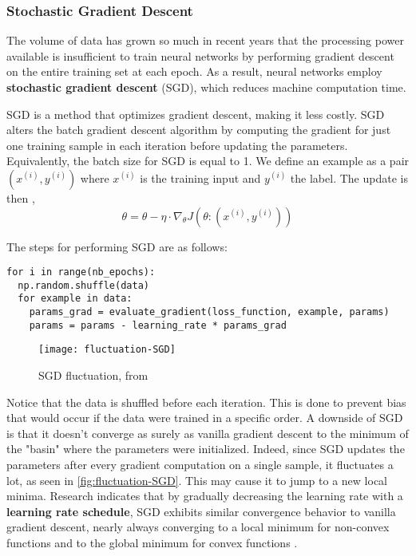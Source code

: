 \documentclass{article}
\begin{document}
\subsubsection{Stochastic Gradient Descent}%
  \label{subsub:Stochastic Gradient Descent}

The volume of data has grown so much in recent years that the processing power available is insufficient to train neural networks by performing gradient descent on the entire training set at each epoch. As a result, neural networks employ \textbf{stochastic gradient descent} (SGD), which reduces machine computation time. 

   SGD is a method that optimizes gradient descent, making it less costly. SGD alters the batch gradient descent algorithm by computing the gradient for just one training sample in each iteration before updating the parameters. Equivalently, the batch size for SGD is equal to 1. We define an example as a pair $(x^{(i)}, y^{(i)})$ where $x^{(i)}$ is the training input and $y^{(i)}$ the label. The update is then \citep{ruder2017overview},
   $$\theta = \theta - \eta \cdot \nabla_\theta J(\theta :(x^{(i)}, y^{(i)}) ) $$

   The steps for performing SGD are as follows:
\begin{verbatim}
for i in range(nb_epochs): 
  np.random.shuffle(data) 
  for example in data:
    params_grad = evaluate_gradient(loss_function, example, params) 
    params = params - learning_rate * params_grad
\end{verbatim}
\begin{wrapfigure}{R}{0.4\textwidth} %
    \centering
    \texttt{[image: fluctuation-SGD]}
    \caption{SGD fluctuation, from \citep{ruder2017overview}}
    \label{fig:fluctuation-SGD}
\end{wrapfigure}
Notice that the data is shuffled before each iteration. This is done to prevent bias that would occur if the data were trained in a specific order. A downside of SGD is that it doesn't converge as surely as vanilla gradient descent to the minimum of the "basin" where the parameters were initialized. Indeed, since SGD updates the parameters after every gradient computation on a single sample, it fluctuates a lot, as seen in \autoref{fig:fluctuation-SGD}. This may cause it to jump to a new local minima. Research indicates that by gradually decreasing the learning rate with a \textbf{learning rate schedule}, SGD exhibits similar convergence behavior to vanilla gradient descent, nearly always converging to a local minimum for non-convex functions and to the global minimum for convex functions \citep{ruder2017overview}.
\end{document}
